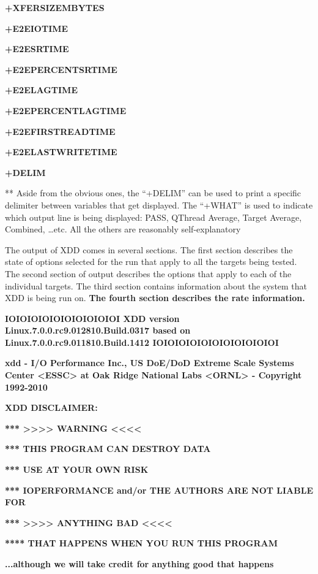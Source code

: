 \textbf{+XFERSIZEMBYTES}

\textbf{+E2EIOTIME}

\textbf{+E2ESRTIME}

\textbf{+E2EPERCENTSRTIME}

\textbf{+E2ELAGTIME}

\textbf{+E2EPERCENTLAGTIME}

\textbf{+E2EFIRSTREADTIME}

\textbf{+E2ELASTWRITETIME}

\textbf{+DELIM}

** Aside from the obvious ones, the ``+DELIM'' can be used to print a specific delimiter between variables that get displayed. The ``+WHAT'' is used to indicate which output line is being displayed: PASS, QThread Average, Target Average, Combined, \ldots etc. All the others are reasonably self-explanatory

The output of XDD comes in several sections. The first section describes the state of options selected for the run that apply to all the targets being tested. The second section of output describes the options that apply to each of the individual targets. The third section contains information about the system that XDD is being run on. \textbf{The fourth section describes the rate information.}

\textbf{IOIOIOIOIOIOIOIOIOIOI XDD version Linux.7.0.0.rc9.012810.Build.0317 based on Linux.7.0.0.rc9.011810.Build.1412 IOIOIOIOIOIOIOIOIOIOIOI}

\textbf{xdd - I/O Performance Inc., US DoE/DoD Extreme Scale Systems Center \textless ESSC\textgreater{} at Oak Ridge National Labs \textless ORNL\textgreater{} - Copyright 1992-2010}

\textbf{XDD DISCLAIMER:}

\textbf{*** \textgreater\textgreater\textgreater\textgreater{} WARNING \textless\textless\textless\textless{}}

\textbf{*** THIS PROGRAM CAN DESTROY DATA}

\textbf{*** USE AT YOUR OWN RISK}

\textbf{*** IOPERFORMANCE and/or THE AUTHORS ARE NOT LIABLE FOR}

\textbf{*** \textgreater\textgreater\textgreater\textgreater{} ANYTHING BAD \textless\textless\textless\textless{}}

\textbf{**** THAT HAPPENS WHEN YOU RUN THIS PROGRAM}

\textbf{...although we will take credit for anything good that happens}

